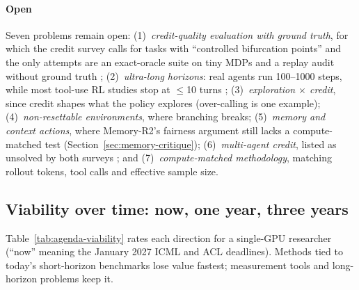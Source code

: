 \paragraph{Open}
Seven problems remain open: (1)~\emph{credit-quality evaluation with ground truth}, for which the credit survey calls for tasks with ``controlled bifurcation points'' \citep{zhang2026from}\unverified{} and the only attempts are an exact-oracle suite on tiny MDPs \citep{hectopascal2026agentcreditbench}\unverified{} and a replay audit without ground truth \citep{zhang2026credit}; (2)~\emph{ultra-long horizons}: real agents run 100--1000 steps, while most tool-use RL studies stop at $\leq$10 turns \citep{zhang2025landscape}; (3)~\emph{exploration $\times$ credit}, since credit shapes what the policy explores (over-calling is one example); (4)~\emph{non-resettable environments}, where branching breaks; (5)~\emph{memory and context actions}, where Memory-R2's fairness argument still lacks a compute-matched test (Section~\ref{sec:memory-critique}); (6)~\emph{multi-agent credit}, listed as unsolved by both surveys \citep{zhang2025landscape,zhang2026from}; and (7)~\emph{compute-matched methodology}, matching rollout tokens, tool calls and effective sample size.

\subsection{Viability over time: now, one year, three years}

Table~\ref{tab:agenda-viability} rates each direction for a single-GPU researcher (``now'' meaning the January 2027 ICML and ACL deadlines). Methods tied to today's short-horizon benchmarks lose value fastest; measurement tools and long-horizon problems keep it.

